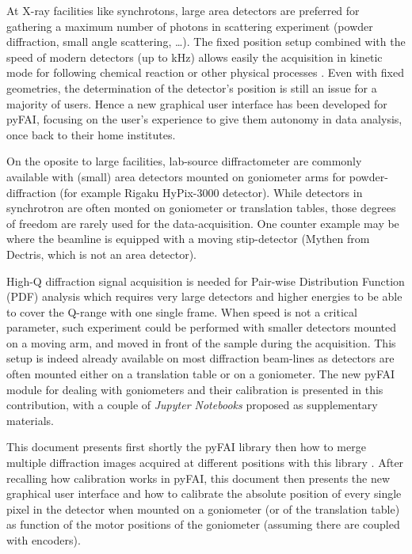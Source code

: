 \documentclass[preprint, pdf]{iucr}              %
\begin{document}
At X-ray facilities like synchrotons, large area detectors are 
preferred for gathering a maximum number of photons in
scattering experiment (powder diffraction, small angle
scattering, \ldots).
The fixed position setup combined with the speed of modern detectors (up
to kHz) allows easily the acquisition in kinetic mode for following chemical
reaction or other physical processes \cite{id15, id31}.
Even with fixed geometries, the determination of the detector's position is
still an issue for a majority of users. 
Hence a new graphical user interface has been developed for pyFAI, focusing
on the user's experience to give them autonomy in data analysis, once back to
their home institutes.


On the oposite to large facilities, lab-source diffractometer are commonly
available with (small) area detectors mounted on goniometer arms for
powder-diffraction (for example Rigaku HyPix-3000 detector).
While detectors in synchrotron are often monted on goniometer or translation
tables, those degrees of freedom are rarely used for the data-acquisition.  
One counter example may be \cite{Gao:kc5032} where the beamline is equipped with
a moving stip-detector (Mythen from Dectris, which is not an area detector).




High-Q diffraction signal acquisition is needed \cite{Chupas:wf5000} for
Pair-wise Distribution Function (PDF) analysis which requires very large
detectors and higher energies to be able to cover the Q-range with one single frame.
When speed is not a critical parameter, such experiment could be performed
with smaller detectors mounted on a moving arm, and moved in front of
the sample during the acquisition. 
This setup is indeed already available on most diffraction beam-lines as
detectors are often mounted either on a translation table or on a
goniometer. 
The new pyFAI module for dealing with goniometers and their calibration is
presented in this contribution, with a couple of \textit{Jupyter Notebooks}
\cite{ipython} proposed as supplementary materials.

This document presents first shortly the pyFAI library \cite{fv5028} then how to
merge multiple diffraction images acquired at different positions with this
library \cite{PyFAI_PDJ}. 
After recalling how calibration works in pyFAI, this document then 
presents the new graphical user interface and how to
calibrate the absolute position of every single pixel in the detector when
mounted on a goniometer (or of the translation table) as function of the  motor
positions of the goniometer (assuming there are coupled with encoders). 
\end{document}
